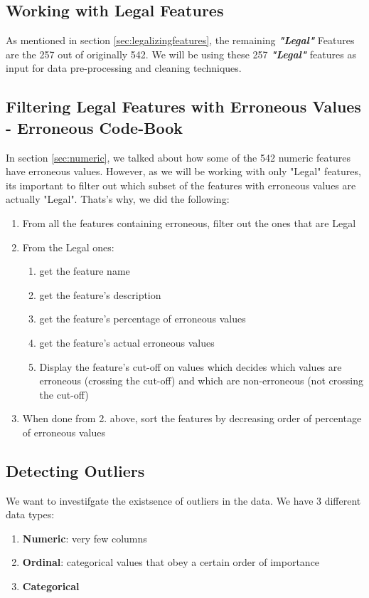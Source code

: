 \documentclass{article}
\begin{document}
\subsection{Working with Legal Features}
As mentioned in section \ref{sec:legalizingfeatures}, the remaining \textbf{\textit{"Legal"}} Features are the 257 out of originally 542. We will be using these 257 \textbf{\textit{"Legal"}} features as input for data pre-processing and cleaning techniques.

\subsection{Filtering Legal Features with Erroneous Values - Erroneous Code-Book}
In section \ref{sec:numeric}, we talked about how some of the 542 numeric features have erroneous values. However, as we will be working with only "Legal" features, its important to filter out which subset of the features with erroneous values are actually "Legal". Thats's why, we did the following:

\begin{enumerate}
    \item From all the features containing erroneous, filter out the ones that are Legal
    \item From the Legal ones:
    \begin{enumerate}
        \item get the feature name
        \item get the feature's description
        \item get the feature's percentage of erroneous values
        \item get the feature's actual erroneous values
        \item Display the feature's cut-off on values which decides which values are erroneous (crossing the cut-off) and which are non-erroneous (not crossing the cut-off)
    \end{enumerate}
    \item When done from 2. above, sort the features by decreasing order of percentage of erroneous values
\end{enumerate}

\subsection{Detecting Outliers}
We want to investifgate the existsence of outliers in the data. We have 3 different data types:
\begin{enumerate}
    \item \textbf{Numeric}: very few columns
    \item \textbf{Ordinal}: categorical values that obey a certain order of importance
    \item \textbf{Categorical}
\end{enumerate}
\end{document}
